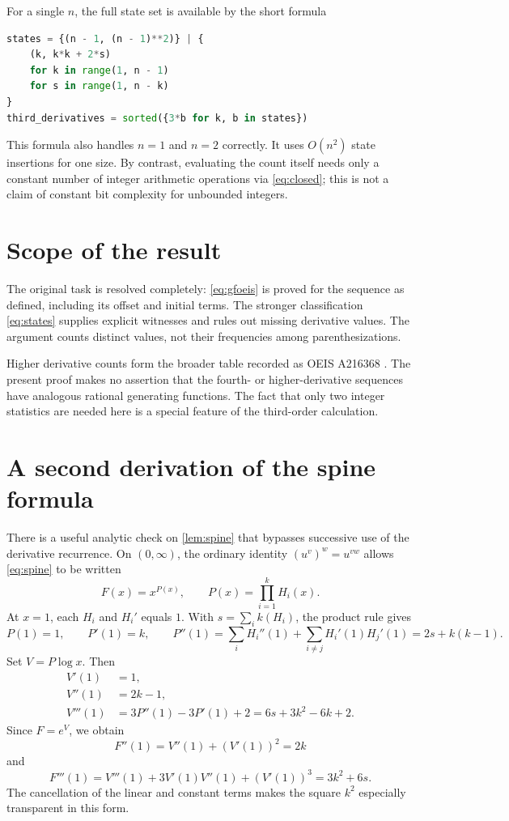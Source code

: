 \documentclass[11pt,letterpaper]{article}
\numberwithin{equation}{section}
\theoremstyle{definition}
\theoremstyle{remark}
\begin{document}
For a single $n$, the full state set is available by the short formula
\begin{lstlisting}[language=Python]
states = {(n - 1, (n - 1)**2)} | {
    (k, k*k + 2*s)
    for k in range(1, n - 1)
    for s in range(1, n - k)
}
third_derivatives = sorted({3*b for k, b in states})
\end{lstlisting}
This formula also handles $n=1$ and $n=2$ correctly. It uses
$O(n^2)$ state insertions for one size. By contrast, evaluating the
count itself needs only a constant number of integer arithmetic
operations via \eqref{eq:closed}; this is not a claim of constant
bit complexity for unbounded integers.

\section{Scope of the result}
The original task is resolved completely: \eqref{eq:gfoeis} is proved
for the sequence as defined, including its offset and initial terms.
The stronger classification \eqref{eq:states} supplies explicit
witnesses and rules out missing derivative values. The argument counts
distinct values, not their frequencies among parenthesizations.

Higher derivative counts form the broader table recorded as OEIS
A216368 \cite{OEIS216368}. The present proof makes no assertion that
the fourth- or higher-derivative sequences have analogous rational
generating functions. The fact that only two integer statistics are
needed here is a special feature of the third-order calculation.

\appendix
\section{A second derivation of the spine formula}
\label{app:alternate}
There is a useful analytic check on \cref{lem:spine} that bypasses
successive use of the derivative recurrence. On $(0,\infty)$, the
ordinary identity $(u^v)^w=u^{vw}$ allows \eqref{eq:spine} to be written
\[
 F(x)=x^{P(x)},\qquad P(x)=\prod_{i=1}^kH_i(x).
\]
At $x=1$, each $H_i$ and $H_i'$ equals $1$. With
$s=\sum_i k(H_i)$, the product rule gives
\[
 P(1)=1,\qquad P'(1)=k,\qquad
 P''(1)=\sum_iH_i''(1)+\sum_{i\ne j}H_i'(1)H_j'(1)
       =2s+k(k-1).
\]
Set $V=P\log x$. Then
\begin{align*}
 V'(1)&=1,\\
 V''(1)&=2k-1,\\
 V'''(1)&=3P''(1)-3P'(1)+2
          =6s+3k^2-6k+2.
\end{align*}
Since $F=e^V$, we obtain
\[
 F''(1)=V''(1)+(V'(1))^2=2k
\]
and
\[
 F'''(1)=V'''(1)+3V'(1)V''(1)+(V'(1))^3=3k^2+6s.
\]
The cancellation of the linear and constant terms makes the square
$k^2$ especially transparent in this form.
\end{document}
